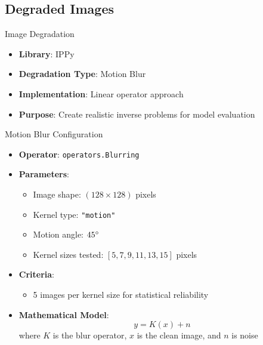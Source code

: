 \subsection{Degraded Images}

\begin{frame}{Image Degradation}
    \begin{itemize}
        \item \textbf{Library}: IPPy
        \item \textbf{Degradation Type}: Motion Blur
        \item \textbf{Implementation}: Linear operator approach
        \item \textbf{Purpose}: Create realistic inverse problems for model evaluation
    \end{itemize}
\end{frame}

\begin{frame}{Motion Blur Configuration}
    \begin{itemize}
        \item \textbf{Operator}: \texttt{operators.Blurring}
        \item \textbf{Parameters}:
              \begin{itemize}
                  \item Image shape: $(128 \times 128)$ pixels
                  \item Kernel type: \texttt{"motion"}
                  \item Motion angle: $45\degree$
                  \item Kernel sizes tested: $[5, 7, 9, 11, 13, 15]$ pixels
              \end{itemize}
        \item \textbf{Criteria}:
              \begin{itemize}
                  \item 5 images per kernel size for statistical reliability
              \end{itemize}
        \item \textbf{Mathematical Model}:
              \begin{equation}
                  y = K(x) + n
              \end{equation}
              where $K$ is the blur operator, $x$ is the clean image, and $n$ is noise
    \end{itemize}
\end{frame}